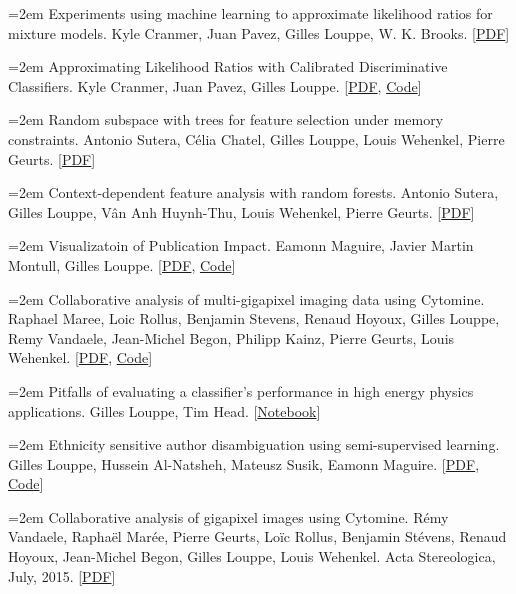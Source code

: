 \documentclass{scrartcl}
\newcommand{\MarginText}[1]{\marginpar{\raggedleft\itshape\small#1}}
\newcommand{\NewPublication}[4]{\noindent\hangindent=2em\hangafter=0 \MarginText{\color{black} #1}{\footnotesize [{\color{Maroon}#2}]} #3 {\footnotesize\color{gray}#4}\vspace{0.5em}}
\begin{document}
\begin{cv}{}
\NewPublication{}{19}{Experiments using machine learning to approximate likelihood ratios for mixture models.}{%
Kyle Cranmer, Juan Pavez, Gilles Louppe, W. K. Brooks.
[\href{http://iopscience.iop.org/article/10.1088/1742-6596/762/1/012034/pdf}{PDF}]}

\NewPublication{}{18}{Approximating Likelihood Ratios with Calibrated Discriminative Classifiers.}{%
Kyle Cranmer, Juan Pavez, Gilles Louppe.
[\href{http://arxiv.org/abs/1506.02169}{PDF}, \href{https://github.com/diana-hep/carl}{Code}]}

\NewPublication{}{18}{Random subspace with trees for feature selection under memory constraints.}{%
Antonio Sutera, Célia Chatel, Gilles Louppe, Louis Wehenkel, Pierre Geurts.
[\href{http://hdl.handle.net/2268/202206}{PDF}]}

\NewPublication{}{18}{Context-dependent feature analysis with random forests.}{%
Antonio Sutera, Gilles Louppe, Vân Anh Huynh-Thu, Louis Wehenkel, Pierre Geurts.
[\href{https://arxiv.org/abs/1605.03848}{PDF}]}

\NewPublication{}{17}{Visualizatoin of Publication Impact.}{%
Eamonn Maguire, Javier Martin Montull, Gilles Louppe.
[\href{https://arxiv.org/abs/1605.06242}{PDF}, \href{https://github.com/inspirehep/impact-graphs}{Code}]}

\NewPublication{}{16}{Collaborative analysis of multi-gigapixel imaging data using Cytomine.}{%
Raphael Maree, Loic Rollus, Benjamin Stevens, Renaud Hoyoux, Gilles Louppe, Remy Vandaele, Jean-Michel Begon, Philipp Kainz, Pierre Geurts, Louis Wehenkel.
[\href{http://bioinformatics.oxfordjournals.org/content/early/2016/01/09/bioinformatics.btw013.full.pdf+html}{PDF}, \href{http://www.cytomine.be/}{Code}]}

\NewPublication{2015}{15}{Pitfalls of evaluating a classifier’s performance in high energy physics applications.}{%
Gilles Louppe, Tim Head.
[\href{http://dx.doi.org/10.5281/zenodo.34934}{Notebook}]}

\NewPublication{}{14}{Ethnicity sensitive author disambiguation using semi-supervised learning.}{%
Gilles Louppe, Hussein Al-Natsheh, Mateusz Susik, Eamonn Maguire.
[\href{http://arxiv.org/abs/1508.07744}{PDF}, \href{https://github.com/glouppe/paper-author-disambiguation/}{Code}]}

\NewPublication{}{13}{Collaborative analysis of gigapixel images using Cytomine.}{%
Rémy Vandaele, Raphaël Marée, Pierre Geurts, Loïc Rollus, Benjamin Stévens, Renaud Hoyoux, Jean-Michel Begon, Gilles Louppe, Louis Wehenkel.
Acta Stereologica, July, 2015.
[\href{http://popups.ulg.ac.be/0351-580X/index.php?id=3692&file=1&pid=3681}{PDF}]}


\end{cv}
\end{document}
